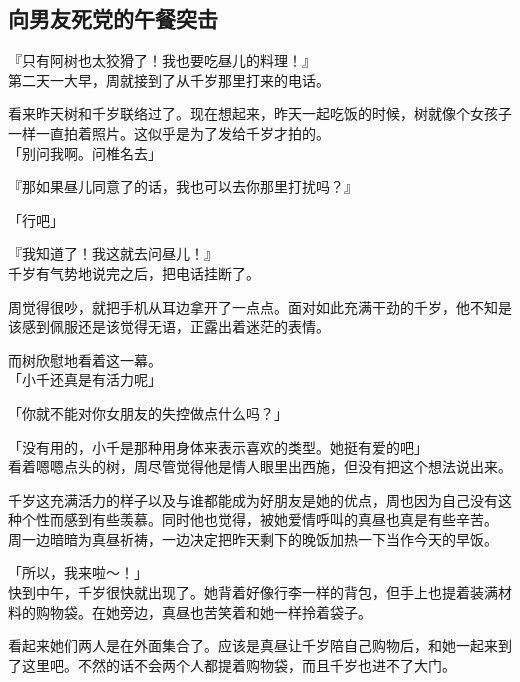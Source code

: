 \subsection{向男友死党的午餐突击}

『只有阿树也太狡猾了！我也要吃昼儿的料理！』\\

第二天一大早，周就接到了从千岁那里打来的电话。

看来昨天树和千岁联络过了。现在想起来，昨天一起吃饭的时候，树就像个女孩子一样一直拍着照片。这似乎是为了发给千岁才拍的。\\

「别问我啊。问椎名去」

『那如果昼儿同意了的话，我也可以去你那里打扰吗？』

「行吧」

『我知道了！我这就去问昼儿！』\\

千岁有气势地说完之后，把电话挂断了。

周觉得很吵，就把手机从耳边拿开了一点点。面对如此充满干劲的千岁，他不知是该感到佩服还是该觉得无语，正露出着迷茫的表情。

而树欣慰地看着这一幕。\\

「小千还真是有活力呢」

「你就不能对你女朋友的失控做点什么吗？」

「没有用的，小千是那种用身体来表示喜欢的类型。她挺有爱的吧」\\

看着嗯嗯点头的树，周尽管觉得他是情人眼里出西施，但没有把这个想法说出来。

千岁这充满活力的样子以及与谁都能成为好朋友是她的优点，周也因为自己没有这种个性而感到有些羡慕。同时他也觉得，被她爱情呼叫的真昼也真是有些辛苦。\\

周一边暗暗为真昼祈祷，一边决定把昨天剩下的晚饭加热一下当作今天的早饭。\\

\vspace{2\baselineskip}

「所以，我来啦～！」\\

快到中午，千岁很快就出现了。她背着好像行李一样的背包，但手上也提着装满材料的购物袋。在她旁边，真昼也苦笑着和她一样拎着袋子。

看起来她们两人是在外面集合了。应该是真昼让千岁陪自己购物后，和她一起来到了这里吧。不然的话不会两个人都提着购物袋，而且千岁也进不了大门。\\

